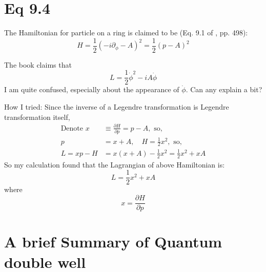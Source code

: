 \documentclass{article}
\begin{document}
\section{Eq 9.4}

The Hamiltonian for particle on a ring is claimed to be (Eq. 9.1 of
\cite{Altland2010}, pp. 498):
\begin{equation}
    H = \frac{1}{2}(-i\partial_\phi -A)^2 = \frac{1}{2}(p-A)^2
\end{equation}

The book \cite{Altland2010} claims that 
\begin{equation}
    L = \frac{1}{2}\dot{\phi}^2 - iA \dot{\phi}
\end{equation}
I am quite confused, especially about the appearance of $\dot{\phi}$. Can any explain
a bit?

How I tried: Since the inverse of a Legendre transformation is Legendre
transformation itself, 
\begin{align}
    \text{Denote }x &\equiv \frac{\partial H}{\partial p} = p-A,\text{ so,} \\
    p &= x + A,\quad H = \frac{1}{2}x^2 ,\text{ so,}\\
    L = x p - H &= x(x+A) - \frac{1}{2}x^2 = \frac{1}{2}x^2 + x A 
\end{align}
So my calculation found that the Lagrangian of above Hamiltonian is:
\begin{equation}
    L = \frac{1}{2}x^2 + x A
\end{equation}
where
\begin{equation}
    x = \frac{\partial H}{\partial p}
\end{equation}


{}


\printnomenclature
\section{A brief Summary of Quantum double well}
\end{document}
